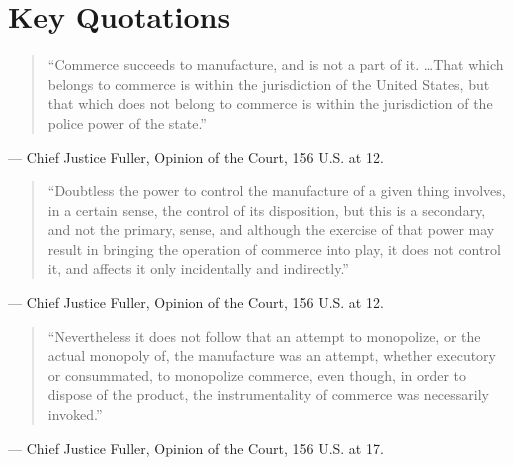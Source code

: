 \documentclass[12pt]{article}
\begin{document}
\section{Key Quotations}

\begin{quote}
``Commerce succeeds to manufacture, and is not a part of it. \ldots That which belongs to commerce is within the jurisdiction of the United States, but that which does not belong to commerce is within the jurisdiction of the police power of the state.''
\end{quote}
\noindent --- Chief Justice Fuller, Opinion of the Court, 156 U.S. at 12.

\begin{quote}
``Doubtless the power to control the manufacture of a given thing involves, in a certain sense, the control of its disposition, but this is a secondary, and not the primary, sense, and although the exercise of that power may result in bringing the operation of commerce into play, it does not control it, and affects it only incidentally and indirectly.''
\end{quote}
\noindent --- Chief Justice Fuller, Opinion of the Court, 156 U.S. at 12.

\begin{quote}
``Nevertheless it does not follow that an attempt to monopolize, or the actual monopoly of, the manufacture was an attempt, whether executory or consummated, to monopolize commerce, even though, in order to dispose of the product, the instrumentality of commerce was necessarily invoked.''
\end{quote}
\noindent --- Chief Justice Fuller, Opinion of the Court, 156 U.S. at 17.
\end{document}
